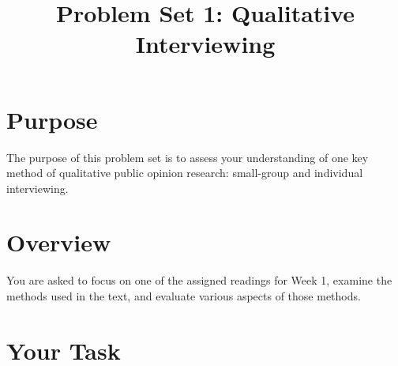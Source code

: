 \documentclass[a4paper]{exam}
\title{Problem Set 1: Qualitative Interviewing}
\date{}
\begin{document}
\vspace{-4em}
\maketitle

\section{Purpose}\label{purpose}

The purpose of this problem set is to assess your understanding of one key method of qualitative public opinion research: small-group and individual interviewing.

\section{Overview}\label{overview}

You are asked to focus on one of the assigned readings for Week 1, examine the methods used in the text, and evaluate various aspects of those methods. 

\section{Your Task}\label{your-task}
\end{document}
